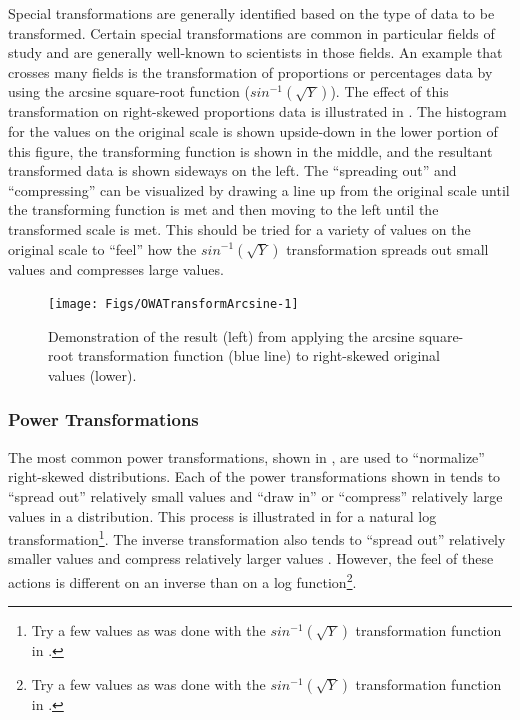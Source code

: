 \documentclass[10pt,openany]{book}\usepackage[]{graphicx}\usepackage[]{color}
\newenvironment{knitrout}{}{} %
\begin{document}
Special transformations are generally identified based on the type of data to be transformed.  Certain special transformations are common in particular fields of study and are generally well-known to scientists in those fields.  An example that crosses many fields is the transformation of proportions or percentages data by using the arcsine square-root function ($sin^{-1}(\sqrt{Y})$).  The effect of this transformation on right-skewed proportions data is illustrated in .  The histogram for the values on the original scale is shown upside-down in the lower portion of this figure, the transforming function is shown in the middle, and the resultant transformed data is shown sideways on the left.  The ``spreading out'' and ``compressing'' can be visualized by drawing a line up from the original scale until the transforming function is met and then moving to the left until the transformed scale is met.  This should be tried for a variety of values on the original scale to ``feel'' how the $sin^{-1}(\sqrt{Y})$ transformation spreads out small values and compresses large values.

\begin{knitrout}
\color{fgcolor}\begin{figure}[!h]

{\centering \texttt{[image: Figs/OWATransformArcsine-1]} 

}

\caption[Demonstration of the result (left) from applying the arcsine square-root transformation function (blue line) to right-skewed original values (lower)]{Demonstration of the result (left) from applying the arcsine square-root transformation function (blue line) to right-skewed original values (lower).}\label{fig:OWATransformArcsine}
\end{figure}


\end{knitrout}

\subsubsection{Power Transformations}
The most common power transformations, shown in , are used to ``normalize'' right-skewed distributions.  Each of the power transformations shown in  tends to ``spread out'' relatively small values and ``draw in'' or ``compress'' relatively large values in a distribution.  This process is illustrated in  for a natural log transformation\footnote{Try a few values as was done with the $sin^{-1}(\sqrt{Y})$ transformation function in .}.  The inverse transformation also tends to ``spread out'' relatively smaller values and compress relatively larger values .  However, the feel of these actions is different on an inverse than on a log function\footnote{Try a few values as was done with the $sin^{-1}(\sqrt{Y})$ transformation function in .}.
\end{document}
